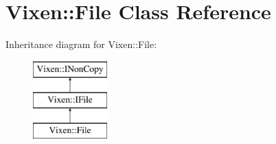 \hypertarget{class_vixen_1_1_file}{}\section{Vixen\+:\+:File Class Reference}
\label{class_vixen_1_1_file}
Inheritance diagram for Vixen\+:\+:File\+:\begin{figure}[H]
\begin{center}
\leavevmode
\includegraphics[height=3.000000cm]{class_vixen_1_1_file}
\end{center}
\end{figure}
